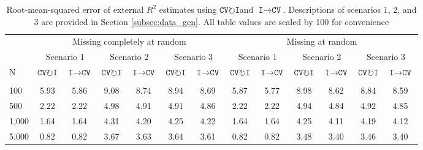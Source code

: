 \documentclass[AMA,STIX1COL,doublespace]{WileyNJD-v2}
\begin{document}
\begin{table}

\caption{\label{tab:rmse}Root-mean-squared error of external $R^2$ estimates using $\texttt{CV}\!\circlearrowright\!\texttt{I}$\space and $\texttt{I}\!\!\rightarrow\!\texttt{CV}$. Descriptions of scenarios 1, 2, and 3 are provided in Section \ref{subsec:data_gen}. All table values are scaled by 100 for convenience}
\centering
\begin{tabular}[t]{lcccccccccccc}
\toprule
\multicolumn{1}{c}{ } & \multicolumn{6}{c}{Missing completely at random} & \multicolumn{6}{c}{Missing at random} \\
\cmidrule(l{3pt}r{3pt}){2-7} \cmidrule(l{3pt}r{3pt}){8-13}
\multicolumn{1}{c}{ } & \multicolumn{2}{c}{Scenario 1} & \multicolumn{2}{c}{Scenario 2} & \multicolumn{2}{c}{Scenario 3} & \multicolumn{2}{c}{Scenario 1} & \multicolumn{2}{c}{Scenario 2} & \multicolumn{2}{c}{Scenario 3} \\
\cmidrule(l{3pt}r{3pt}){2-3} \cmidrule(l{3pt}r{3pt}){4-5} \cmidrule(l{3pt}r{3pt}){6-7} \cmidrule(l{3pt}r{3pt}){8-9} \cmidrule(l{3pt}r{3pt}){10-11} \cmidrule(l{3pt}r{3pt}){12-13}
N & $\texttt{CV}\!\circlearrowright\!\texttt{I}$& $\texttt{I}\!\!\rightarrow\!\texttt{CV}$& $\texttt{CV}\!\circlearrowright\!\texttt{I}$& $\texttt{I}\!\!\rightarrow\!\texttt{CV}$& $\texttt{CV}\!\circlearrowright\!\texttt{I}$& $\texttt{I}\!\!\rightarrow\!\texttt{CV}$& $\texttt{CV}\!\circlearrowright\!\texttt{I}$& $\texttt{I}\!\!\rightarrow\!\texttt{CV}$& $\texttt{CV}\!\circlearrowright\!\texttt{I}$& $\texttt{I}\!\!\rightarrow\!\texttt{CV}$& $\texttt{CV}\!\circlearrowright\!\texttt{I}$& $\texttt{I}\!\!\rightarrow\!\texttt{CV}$\\
\midrule
\addlinespace[0.75em]
\multicolumn{13}{l}{\textbf{10 predictors, 10 junk}}\\
\hline
\hspace{1em}100 & 5.93 & 5.86 & 9.08 & 8.74 & 8.94 & 8.69 & 5.87 & 5.77 & 8.98 & 8.62 & 8.84 & 8.59\\
\hspace{1em}500 & 2.22 & 2.22 & 4.98 & 4.91 & 4.91 & 4.86 & 2.22 & 2.22 & 4.94 & 4.84 & 4.92 & 4.85\\
\hspace{1em}1,000 & 1.64 & 1.64 & 4.31 & 4.20 & 4.25 & 4.22 & 1.64 & 1.64 & 4.25 & 4.11 & 4.19 & 4.12\\
\hspace{1em}5,000 & 0.82 & 0.82 & 3.67 & 3.63 & 3.64 & 3.61 & 0.82 & 0.82 & 3.48 & 3.40 & 3.46 & 3.40\\

\end{tabular}
\end{table}
\end{document}
